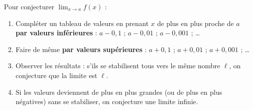 \documentclass[11pt]{article}
\begin{document}
\begin{methode}
Pour conjecturer $\displaystyle\lim_{x \to a} f(x)$ :
\begin{enumerate}
\item Compléter un tableau de valeurs en prenant $x$ de plus en plus proche de $a$ \textbf{par valeurs inférieures} : $a - 0{,}1$ ; $a - 0{,}01$ ; $a - 0{,}001$ ; \ldots
\item Faire de même \textbf{par valeurs supérieures} : $a + 0{,}1$ ; $a + 0{,}01$ ; $a + 0{,}001$ ; \ldots
\item Observer les résultats : s'ils se stabilisent tous vers le même nombre $\ell$, on conjecture que la limite est $\ell$.
\item Si les valeurs deviennent de plus en plus grandes (ou de plus en plus négatives) sans se stabiliser, on conjecture une limite infinie.
\end{enumerate}
\end{methode}
\end{document}
